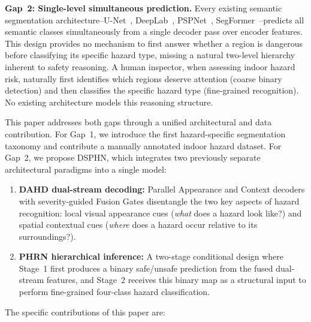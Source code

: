 \noindent\textbf{Gap~2: Single-level simultaneous prediction.}
Every existing semantic segmentation architecture--U-Net~\cite{ronneberger2015unet},
DeepLab~\cite{chen2017deeplab}, PSPNet~\cite{zhao2017pyramid},
SegFormer~\cite{xie2021segformer}--predicts all semantic classes
simultaneously from a single decoder pass over encoder features.
This design provides no mechanism to first answer whether a region
is dangerous before classifying its specific hazard type, missing
a natural two-level hierarchy inherent to safety reasoning. A
human inspector, when assessing indoor hazard risk, naturally first
identifies which regions deserve attention (coarse binary detection)
and then classifies the specific hazard type (fine-grained recognition).
No existing architecture models this reasoning structure.

This paper addresses both gaps through a unified architectural
and data contribution. For Gap~1, we introduce the first
hazard-specific segmentation taxonomy and contribute a manually
annotated indoor hazard dataset. For Gap~2, we propose DSPHN,
which integrates two previously separate architectural paradigms
into a single model:

\begin{enumerate}
\item \textbf{DAHD dual-stream decoding:} Parallel Appearance and
Context decoders with severity-guided Fusion Gates disentangle the
two key aspects of hazard recognition: local visual appearance cues
(\textit{what} does a hazard look like?) and spatial contextual cues
(\textit{where} does a hazard occur relative to its surroundings?).

\item \textbf{PHRN hierarchical inference:} A two-stage conditional
design where Stage~1 first produces a binary safe/unsafe prediction
from the fused dual-stream features, and Stage~2 receives this
binary map as a structural input to perform fine-grained four-class
hazard classification.
\end{enumerate}

The specific contributions of this paper are:

